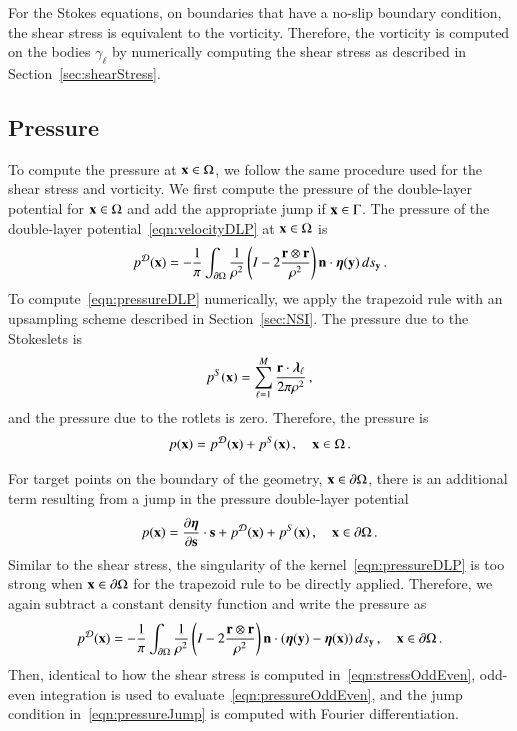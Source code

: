 \documentclass[preprint, 10pt]{elsarticle}
\begin{document}
For the Stokes equations, on boundaries that have a no-slip boundary condition, the shear stress is equivalent to the vorticity.  Therefore, the vorticity is computed on the bodies $\gamma_\ell$ by numerically computing the shear stress as described in Section~\ref{sec:shearStress}.

\subsection{Pressure}
\label{sec:pressure}
To compute the pressure at ${\mathbf{x}} \in \Omega$, we follow the same procedure used for the shear stress and vorticity.  We first compute the pressure of the double-layer potential for ${\mathbf{x}} \in \Omega$ and add the appropriate jump if ${\mathbf{x}} \in \Gamma$. The pressure of the double-layer potential~\eqref{eqn:velocityDLP} at ${\mathbf{x}} \in \Omega$ is
\begin{align}
  p^{{\mathcal{D}}}({\mathbf{x}}) = -\frac{1}{\pi}\int_{{\partial}\Omega} \frac{1}{\rho^2}
    \left(I - 2 \frac{{\mathbf{r}} \otimes {\mathbf{r}}}{\rho^2}\right) 
    {\mathbf{n}} \cdot {\boldsymbol\eta}({\mathbf{y}}) \,ds_{\mathbf{y}} \, .
    \label{eqn:pressureDLP}
\end{align}
To compute~\eqref{eqn:pressureDLP} numerically, we apply the trapezoid rule with an upsampling scheme described in Section~\ref{sec:NSI}.  The pressure due to the Stokeslets is
\begin{align}
  p^S({\mathbf{x}}) = \sum_{\ell=1}^{M}\frac{{\mathbf{r}} \cdot
  {\boldsymbol\lambda}_\ell}{2\pi\rho^2}\, ,
\end{align}
and the pressure due to the rotlets is zero.  Therefore, the pressure is
\begin{align}
  p({\mathbf{x}}) = p^{{\mathcal{D}}}({\mathbf{x}}) + p^{S}({\mathbf{x}})\, , \quad {\mathbf{x}} \in \Omega \, .
\end{align}

For target points on the boundary of the geometry, ${\mathbf{x}} \in {\partial} \Omega$, there is an additional term resulting from a jump in the pressure double-layer potential~\cite{poz1992}
\begin{align}
  p({\mathbf{x}})= \frac{\partial {\boldsymbol\eta}}{\partial {\mathbf{s}}} \cdot {\mathbf{s}} + p^{{\mathcal{D}}}({\mathbf{x}}) + 
              p^{S}({\mathbf{x}})\, , \quad {\mathbf{x}} \in {\partial}\Omega \, .
  \label{eqn:pressureJump}
\end{align}
Similar to the shear stress, the singularity of the kernel~\eqref{eqn:pressureDLP} is too strong when ${\mathbf{x}} \in {\partial}\Omega$ for the trapezoid rule to be directly applied.  Therefore, we again subtract a constant density function and write the pressure as
\begin{align}
  p^{\mathcal{D}}({\mathbf{x}}) = -\frac{1}{\pi}\int_{{\partial}\Omega} \frac{1}{\rho^2}
    \left(I - 2 \frac{{\mathbf{r}} \otimes {\mathbf{r}}}{\rho^2}\right) 
    {\mathbf{n}} \cdot ({\boldsymbol\eta}({\mathbf{y}}) - {\boldsymbol\eta}({\mathbf{x}})) \,ds_{\mathbf{y}}\, , 
    \quad {\mathbf{x}} \in {\partial}\Omega\, .
  \label{eqn:pressureOddEven}
\end{align}
Then, identical to how the shear stress is computed in~\eqref{eqn:stressOddEven}, odd-even integration is used to evaluate~\eqref{eqn:pressureOddEven}, and the jump condition in~\eqref{eqn:pressureJump} is computed with Fourier differentiation.  
\end{document}
